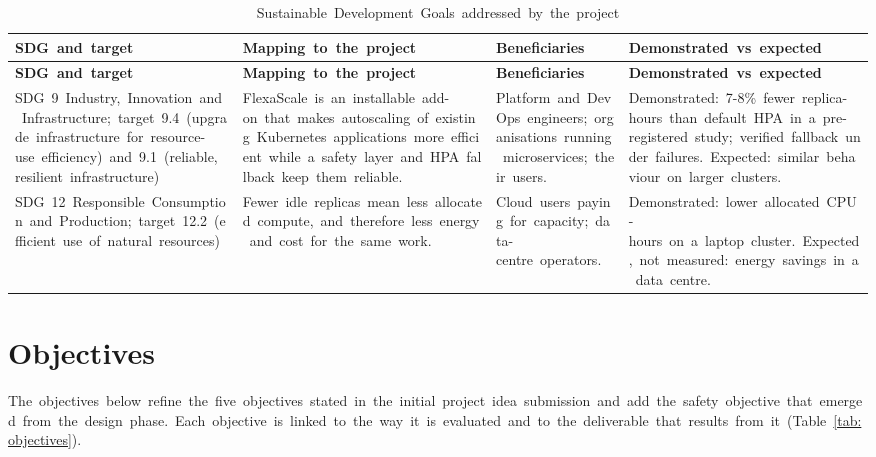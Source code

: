 \documentclass[12pt,a4paper,oneside]{report}
\begin{document}
\begingroup\small\setlength{\tabcolsep}{4pt}\renewcommand{\arraystretch}{1.25}
\begin{longtable}{|>{\raggedright\arraybackslash}p{3.41cm}|>{\raggedright\arraybackslash}p{4.27cm}|>{\raggedright\arraybackslash}p{2.84cm}|>{\raggedright\arraybackslash}p{3.70cm}|}
\caption{Sustainable~Development~Goals~addressed~by~the~project}\label{tab:sdg}\\\hline
\textbf{SDG~and~target} & \textbf{Mapping~to~the~project} & \textbf{Beneficiaries} & \textbf{Demonstrated~vs~expected}\\\hline\endfirsthead
\hline \textbf{SDG~and~target} & \textbf{Mapping~to~the~project} & \textbf{Beneficiaries} & \textbf{Demonstrated~vs~expected}\\\hline\endhead
SDG~9~Industry,~Innovation~and~Infrastructure;~target~9.4~(upgrade~infrastructure~for~resource-use~efficiency)~and~9.1~(reliable,~resilient~infrastructure) & FlexaScale~is~an~installable~add-on~that~makes~autoscaling~of~existing~Kubernetes~applications~more~efficient~while~a~safety~layer~and~HPA~fallback~keep~them~reliable. & Platform~and~DevOps~engineers;~organisations~running~microservices;~their~users. & Demonstrated:~7-8\%~fewer~replica-hours~than~default~HPA~in~a~pre-registered~study;~verified~fallback~under~failures.~Expected:~similar~behaviour~on~larger~clusters.\\\hline
SDG~12~Responsible~Consumption~and~Production;~target~12.2~(efficient~use~of~natural~resources) & Fewer~idle~replicas~mean~less~allocated~compute,~and~therefore~less~energy~and~cost~for~the~same~work. & Cloud~users~paying~for~capacity;~data-centre~operators. & Demonstrated:~lower~allocated~CPU-hours~on~a~laptop~cluster.~Expected,~not~measured:~energy~savings~in~a~data~centre.\\\hline
\end{longtable}\endgroup

\section{Objectives}

The~objectives~below~refine~the~five~objectives~stated~in~the~initial~project~idea~submission~and~add~the~safety~objective~that~emerged~from~the~design~phase.~Each~objective~is~linked~to~the~way~it~is~evaluated~and~to~the~deliverable~that~results~from~it~(Table~\ref{tab:objectives}).
\end{document}
